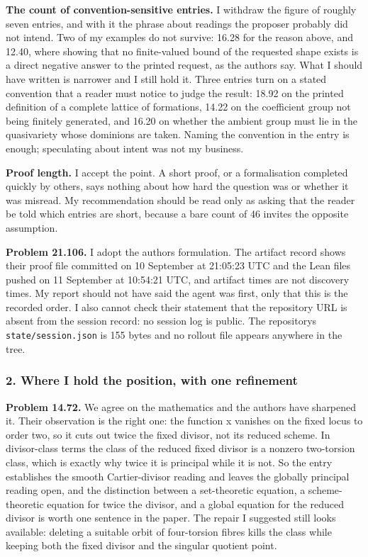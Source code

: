 \textbf{The count of convention-sensitive entries.} I withdraw the
figure of roughly seven entries, and with it the phrase about readings
the proposer probably did not intend. Two of my examples do not survive:
16.28 for the reason above, and 12.40, where showing that no
finite-valued bound of the requested shape exists is a direct negative
answer to the printed request, as the authors say. What I should have
written is narrower and I still hold it. Three entries turn on a stated
convention that a reader must notice to judge the result: 18.92 on the
printed definition of a complete lattice of formations, 14.22 on the
coefficient group not being finitely generated, and 16.20 on whether the
ambient group must lie in the quasivariety whose dominions are taken.
Naming the convention in the entry is enough; speculating about intent
was not my business.

\textbf{Proof length.} I accept the point. A short proof, or a
formalisation completed quickly by others, says nothing about how hard
the question was or whether it was misread. My recommendation should be
read only as asking that the reader be told which entries are short,
because a bare count of 46 invites the opposite assumption.

\textbf{Problem 21.106.} I adopt the authors\textquotesingle{}
formulation. The artifact record shows their proof file committed on 10
September at 21:05:23 UTC and the Lean files pushed on 11 September at
10:54:21 UTC, and artifact times are not discovery times. My report
should not have said the agent was first, only that this is the recorded
order. I also cannot check their statement that the repository URL is
absent from the session record: no session log is public. The
repository\textquotesingle s \nolinkurl{state/session.json} is 155 bytes
and no rollout file appears anywhere in the tree.

\hypertarget{review2-md-where-i-hold-the-position-with-one-refinement}{%
\subsubsection*{2. Where I hold the position, with one
refinement}\label{review2-md-where-i-hold-the-position-with-one-refinement}}

\textbf{Problem 14.72.} We agree on the mathematics and the authors have
sharpened it. Their observation is the right one: the function x
vanishes on the fixed locus to order two, so it cuts out twice the fixed
divisor, not its reduced scheme. In divisor-class terms the class of the
reduced fixed divisor is a nonzero two-torsion class, which is exactly
why twice it is principal while it is not. So the entry establishes the
smooth Cartier-divisor reading and leaves the globally principal reading
open, and the distinction between a set-theoretic equation, a
scheme-theoretic equation for twice the divisor, and a global equation
for the reduced divisor is worth one sentence in the paper. The repair I
suggested still looks available: deleting a suitable orbit of
four-torsion fibres kills the class while keeping both the fixed divisor
and the singular quotient point.

